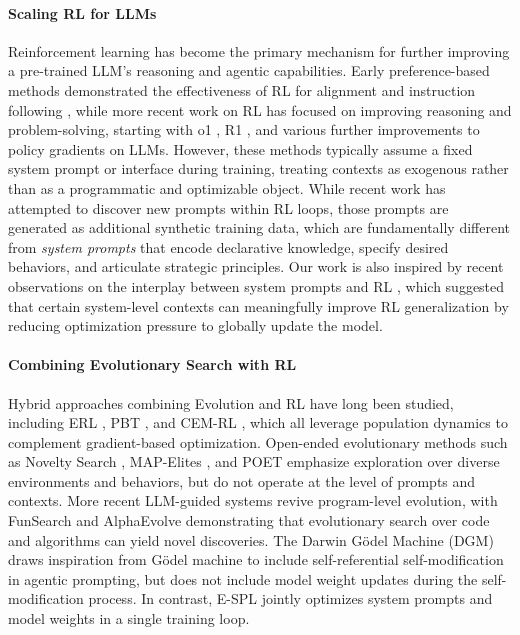\documentclass{article}
\theoremstyle{plain}
\theoremstyle{definition}
\theoremstyle{remark}
\begin{document}
\paragraph{Scaling RL for LLMs} Reinforcement learning has become the primary mechanism for further improving a pre-trained LLM's reasoning and agentic capabilities. Early preference-based methods demonstrated the effectiveness of RL for alignment and instruction following \cite{learning-to-summarize, instructgpt, bai2022training, constitutional-ai}, while more recent work on RL has focused on improving reasoning and problem-solving, starting with o1 \cite{o1-system-card}, R1 \cite{grpo, deepseek-r1}, and various further improvements \cite{kimi-1.5, dapo, cispo, gspo, scalerl} to policy gradients \cite{williams1992simple, ppo} on LLMs. However, these methods typically assume a fixed system prompt or interface during training, treating contexts as exogenous rather than as a programmatic and optimizable object. 
While recent work \cite{reward-guided-prompt-evolving} has attempted to discover new prompts within RL loops, those prompts are generated as additional synthetic training data, which are fundamentally different from \textit{system prompts} that encode declarative knowledge, specify desired behaviors, and articulate strategic principles. Our work is also inspired by recent observations on the interplay between system prompts and RL \cite{tan2025inoculation, azarbal2025recontextualization, macdiarmid2025natural}, which suggested that certain system-level contexts can meaningfully improve RL generalization by reducing optimization pressure to globally update the model.

\vspace{-8pt}
\paragraph{Combining Evolutionary Search with RL} Hybrid approaches combining Evolution and RL have long been studied, including ERL \cite{erl}, PBT \cite{jaderberg2017population}, and CEM-RL \cite{cem-rl}, which all leverage population dynamics to complement gradient-based optimization. Open-ended evolutionary methods such as Novelty Search \cite{novelty-search}, MAP-Elites \cite{map-elites}, and POET \cite{poet} emphasize exploration over diverse environments and behaviors, but do not operate at the level of prompts and contexts. More recent LLM-guided systems revive program-level evolution, with FunSearch \cite{romera2024mathematical} and AlphaEvolve \cite{alphaevolve} demonstrating that evolutionary search over code and algorithms can yield novel discoveries. The Darwin Gödel Machine (DGM) \cite{darwin-godel-machine} draws inspiration from Gödel machine \cite{godel-machines} to include self-referential self-modification in agentic prompting, but does not include model weight updates during the self-modification process. In contrast, E-SPL jointly optimizes system prompts and model weights in a single training loop.
\end{document}
